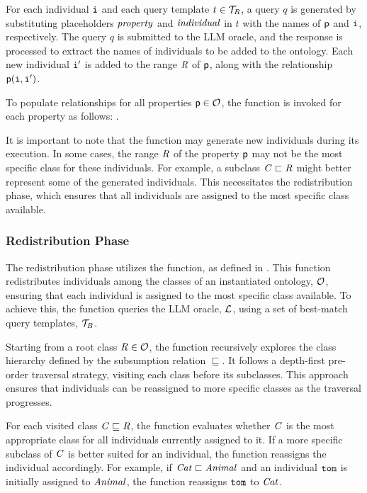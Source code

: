 %
For each individual \(\instance{i}\) and each query template \(t \in \relset{T}_{R}\), a query \(q\) is generated by substituting placeholders \(\mathit{property}\) and \(\mathit{individual}\) in \(t\) with the names of \(\relation{p}\) and \(\instance{i}\), respectively.
%
The query \(q\) is submitted to the \gls{LLM} oracle, and the response is processed to extract the names of individuals to be added to the ontology.
%
Each new individual \(\instance{i}'\) is added to the range \(\concept{R}\) of \(\relation{p}\), along with the relationship \(\relation{p}(\instance{i}, \instance{i}')\).

%
To populate relationships for all properties \(\relation{p} \in \relset{O}\), the function is invoked for each property as follows:
%
.

%
It is important to note that the \relate{} function may generate new individuals during its execution.
%
In some cases, the range \(\concept{R}\) of the property \(\relation{p}\) may not be the most specific class for these individuals.
%
For example, a subclass \(\concept{C} \sqsubset \concept{R}\) might better represent some of the generated individuals.
%
This necessitates the redistribution phase, which ensures that all individuals are assigned to the most specific class available.


\subsubsection{Redistribution Phase}
\label{subsubsec:redistribution-phase}
%

%
The redistribution phase utilizes the \redistribute{} function, as defined in .
%
This function redistributes individuals among the classes of an instantiated ontology, \(\relset{O}\), ensuring that each individual is assigned to the most specific class available.
%
To achieve this, the function queries the \gls{LLM} oracle, \(\relset{L}\), using a set of best-match query templates, \(\relset{T}_{B}\).

%
Starting from a root class \(\concept{R} \in \relset{O}\), the function recursively explores the class hierarchy defined by the subsumption relation \(\sqsubseteq\).
%
It follows a depth-first pre-order traversal strategy, visiting each class before its subclasses.
%
This approach ensures that individuals can be reassigned to more specific classes as the traversal progresses.

%
For each visited class \(\concept{C} \sqsubseteq \concept{R}\), the function evaluates whether \(\concept{C}\) is the most appropriate class for all individuals currently assigned to it.
%
If a more specific subclass of \(\concept{C}\) is better suited for an individual, the function reassigns the individual accordingly.
%
For example, if \(\concept{Cat} \sqsubset \concept{Animal}\) and an individual \(\instance{tom}\) is initially assigned to \(\concept{Animal}\), the function reassigns \(\instance{tom}\) to \(\concept{Cat}\).

